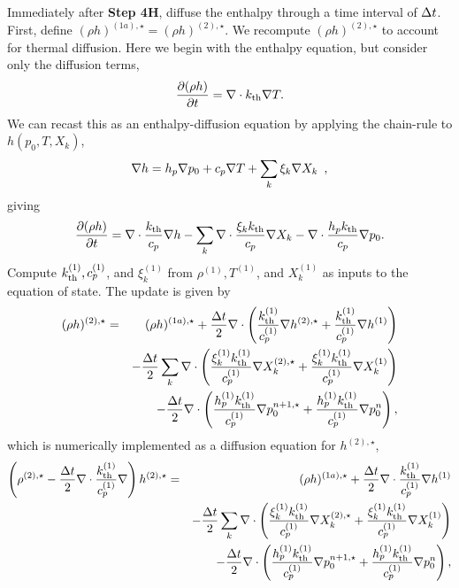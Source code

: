 Immediately after {\bf Step 4H}, diffuse the enthalpy through 
a time interval of $\Delta t$.  First, define $(\rho h)^{(1a),\star} = (\rho h)^{(2),\star}$.  
We recompute $(\rho h)^{(2),\star}$ to account for thermal diffusion.  Here we begin
with the enthalpy equation, but consider only the 
diffusion terms,
\begin{equation}
\frac{\partial (\rho h)}{\partial t} = \nabla\cdot k_{\rm th}\nabla T.
  \end{equation}
We can recast this as an enthalpy-diffusion equation by applying the
chain-rule to $h(p_0,T,X_k)$,
\begin{equation}
\nabla h = h_p \nabla p_0 + c_p \nabla T + \sum_k \xi_k \nabla X_k \enskip ,
\end{equation}
giving
\begin{equation}
  \frac{\partial (\rho h)}{\partial t}  = 
 \nabla\cdot \frac{k_{\rm th}}{c_p}\nabla h -  
 \sum_k \nabla\cdot \frac{\xi_k k_{\rm th}}{c_p}\nabla X_k -
 \nabla\cdot \frac{h_p k_{\rm th}}{c_p}\nabla p_0.
  \end{equation}
Compute $k_{\rm th}^{(1)}, c_p^{(1)}$, and $\xi_k^{(1)}$ from $\rho^{(1)}, T^{(1)}$, and $X_k^{(1)}$ as inputs to the equation of state.  The update is given by
\begin{eqnarray}
(\rho h)^{(2),\star} &=& (\rho h)^{(1a),\star} + \frac{\Delta t}{2}\nabla\cdot\left(\frac{k_{\rm th}^{(1)}}{c_p^{(1)}}\nabla h^{(2),\star} + \frac{k_{\rm th}^{(1)}}{c_p^{(1)}}\nabla h^{(1)}\right)\nonumber\\
&&- \frac{\Delta t}{2}\sum_k\nabla\cdot\left(\frac{\xi_k^{(1)}k_{\rm th}^{(1)}}{c_p^{(1)}}\nabla X_k^{(2),\star} + \frac{\xi_k^{(1)}k_{\rm th}^{(1)}}{c_p^{(1)}}\nabla X_k^{(1)}\right)\nonumber\\
&&- \frac{\Delta t}{2}\nabla\cdot\left(\frac{h_p^{(1)}k_{\rm th}^{(1)}}{c_p^{(1)}}\nabla p_0^{n+1,\star} + \frac{h_p^{(1)}k_{\rm th}^{(1)}}{c_p^{(1)}}\nabla p_0^{n}\right),
\end{eqnarray}
which is numerically implemented as a diffusion equation for $h^{(2),\star}$,
\begin{eqnarray}
\left(\rho^{(2),\star} - \frac{\Delta t}{2}\nabla\cdot\frac{k_{\rm th}^{(1)}}{c_p^{(1)}}\nabla\right)h^{(2),\star} &=& (\rho h)^{(1a),\star} + \frac{\Delta t}{2}\nabla\cdot\frac{k_{\rm th}^{(1)}}{c_p^{(1)}}\nabla h^{(1)}\nonumber\\
&&- \frac{\Delta t}{2}\sum_k\nabla\cdot\left(\frac{\xi_k^{(1)}k_{\rm th}^{(1)}}{c_p^{(1)}}\nabla X_k^{(2),\star} + \frac{\xi_k^{(1)}k_{\rm th}^{(1)}}{c_p^{(1)}}\nabla X_k^{(1)}\right)\nonumber\\
&&- \frac{\Delta t}{2}\nabla\cdot\left(\frac{h_p^{(1)}k_{\rm th}^{(1)}}{c_p^{(1)}}\nabla p_0^{n+1,\star} + \frac{h_p^{(1)}k_{\rm th}^{(1)}}{c_p^{(1)}}\nabla p_0^{n}\right),
\end{eqnarray}

